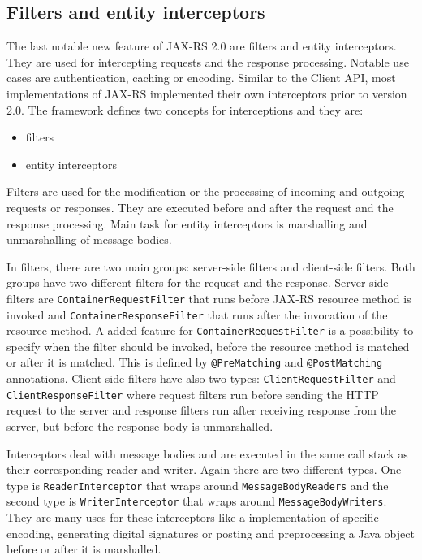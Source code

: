 \documentclass[12pt,final,oneside]{fithesis2}
\begin{document}
\subsection*{Filters and entity interceptors}
The last notable new feature of JAX-RS 2.0 are filters and entity interceptors. They are used for intercepting requests and the response processing. Notable use cases are authentication, caching or encoding. Similar to the Client API, most implementations of JAX-RS implemented their own interceptors prior to version 2.0. The framework defines two concepts for interceptions and they are:
\begin{itemize}
\item 
filters

\item
entity interceptors
\end{itemize}

Filters are used for the modification or the processing of incoming and outgoing requests or responses. They are executed before and after the request and the response processing. Main task for entity interceptors is marshalling and unmarshalling of message bodies.

In filters, there are two main groups: server-side filters and client-side filters. Both groups have two different filters for the request and  the response. Server-side filters are \texttt{ContainerRequestFilter} that runs before JAX-RS resource method is invoked and \texttt{ContainerResponseFilter} that runs after the invocation of the resource method. A added feature for \texttt{ContainerRequestFilter} is a possibility to specify when the filter should be invoked, before the resource method is matched or after it is matched. This is defined by \texttt{@PreMatching} and \texttt{@PostMatching} annotations. Client-side filters have also two types: \texttt{ClientRequestFilter} and \texttt{ClientResponseFilter} where request filters run before sending the HTTP request to the server and response filters run after receiving response from the server, but before the response body is unmarshalled. \cite{jax-rs-2.0}\cite{resteasy-book}

Interceptors deal with message bodies and are executed in the same call stack as their corresponding reader and writer. Again there are two different types. One type is \texttt{ReaderInterceptor} that wraps around \texttt{MessageBodyReaders} and the second type is \texttt{WriterInterceptor} that wraps around \texttt{MessageBodyWriters}. They are many uses for these interceptors like a implementation of specific encoding, generating digital signatures or posting and preprocessing a Java object before or after it is marshalled.\cite{jax-rs-2.0}\cite{cxf-jax}
\end{document}
